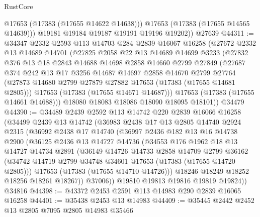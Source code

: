 \begin{lexlean}{RustCore}
\begin{coremodule}
            @17653
            (@17383 (@17655 @14622 @14638)))
          @17653
          (@17383 (@17655 @14565 @14639)))
        @19181
        @19184
        @19187
        @19191
        @19196
        @19202))
    @27639
@44311 := @34347
    @2332
    @2593
    @113
    @14703
    @284
    @2839
    @16067
    @16258
    (@27672
      @2332
      @13
      @14689
      @14701
      (@27825
        @2058
        @22
        @13
        @14689
        @14699
        @3233
        (@27832
          @376
          @13
          @18
          @2843
          @14688
          @14698
          @2858
          @14660
          @2799
          @27849
          (@27687
            @374
            @242
            @13
            @17
            @3256
            @14687
            @14697
            @2858
            @14670
            @2799
            @27764
            (@27873 @14680 @2799 @27879 @27882 @17653 (@17383 (@17655 @14681 @2805)))
            @17653
            (@17383 (@17655 @14671 @14687)))
          @17653
          (@17383 (@17655 @14661 @14688)))
        @18080
        @18083
        @18086
        @18090
        @18095
        @18101))
    @34479
@44390 := @34489
    @2439
    @2592
    @113
    @14742
    @220
    @2839
    @16066
    @16258
    (@34499
      @2439
      @13
      @14742
      (@36983
        @2438
        @17
        @13
        @2805
        @14740
        @2924
        @2315
        (@36992
          @2438
          @17
          @14740
          (@36997
            @2436
            @182
            @13
            @16
            @14738
            @2900
            (@36125
              @2436
              @13
              @14727
              @14736
              (@34553
                @176
                @1962
                @18
                @13
                @14727
                @14734
                @2891
                (@36149
                  @14726
                  @14733
                  @2858
                  @14709
                  @2799
                  @36162
                  (@34742 @14719 @2799 @34748 @34601 @17653 (@17383 (@17655 @14720 @2805)))
                  @17653
                  (@17383 (@17655 @14710 @14726)))
                @18246
                @18249
                @18252
                @18256
                @18261
                @18267))
            @37006))
        @19810
        @19813
        @19816
        @19819
        @19824))
    @34816
@44398 := @43372 @2453 @2591 @113 @14983 @290 @2839 @16065 @16258
@44401 := @35438 @2453 @13 @14983
@44409 := @35445 @2442 @2452 @13 @2805 @7095 @2805 @14983 @35466

\end{coremodule}
\end{lexlean}
